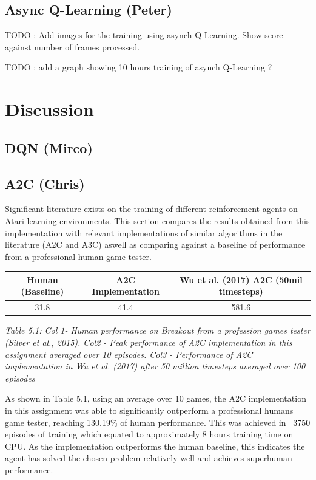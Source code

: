 \documentclass{article}
\begin{document}
\subsection{Async Q-Learning (Peter)}

TODO : Add images for the training using asynch Q-Learning.
Show score against number of frames processed.

TODO : add a graph showing 10 hours training of asynch Q-Learning ?

\section{Discussion}
    

\subsection{DQN (Mirco)}

\subsection{A2C (Chris)}

Significant literature exists on the training of different reinforcement agents on Atari learning environments. This section compares the results obtained from this implementation with relevant implementations of similar algorithms in the literature (A2C and A3C) aswell as comparing against a baseline of performance from a professional human game tester.

\begin{table}[h!]
\centering
\begin{tabular}{|c | c | c |} 
 \hline
 Human (Baseline) & A2C Implementation & Wu et al. (2017) A2C (50mil timesteps) \\ [0.5ex] 
 \hline
 31.8 & 41.4 & 581.6  \\ 
 \hline
\end{tabular}
\end{table}
\emph{Table 5.1: Col 1- Human performance on Breakout from a profession games tester (Silver et al., 2015). Col2 - Peak performance of A2C implementation in this assignment averaged over 10 episodes. Col3 - Performance of A2C implementation in Wu et al. (2017)  after 50 million timesteps averaged over 100 episodes}

As shown in Table 5.1, using an average over 10 games, the A2C implementation in this assignment was able to significantly outperform a professional humans game tester, reaching 130.19\% of human performance. This was achieved in ~3750 episodes of training which equated to approximately 8 hours training time on CPU. As the implementation outperforms the human baseline, this indicates the agent has solved the chosen problem relatively well and achieves superhuman performance. 
\end{document}
